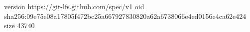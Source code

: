 version https://git-lfs.github.com/spec/v1
oid sha256:09e75e08a17805f472bc25a667927830820a62a6738066e4ed0156e4ca62e424
size 43740
